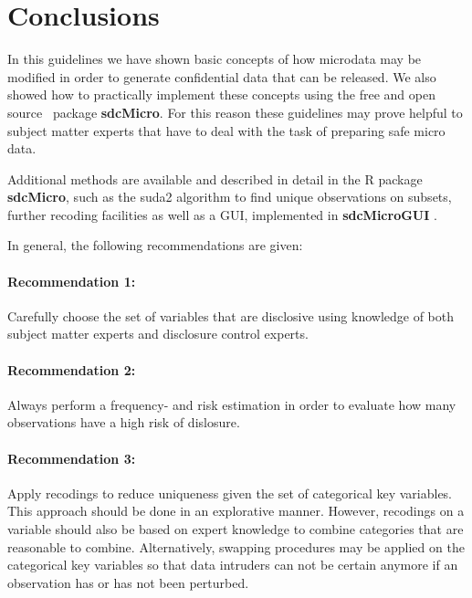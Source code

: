 \documentclass[12pt]{article}
\newcommand{\pkg}[1]{\textbf{#1}}
\newcommand{\proglang}[1]{\textsf{#1}}
\begin{document}

\newpage
\section{Conclusions} \label{sec:conclusions}








In this guidelines we have shown basic concepts of how microdata may be modified in
order to generate confidential data that can be released.
 We also showed how to practically implement these concepts using the free and open source \R~package \pkg{sdcMicro}. 
 For this reason these guidelines may prove helpful to subject matter experts that have to deal with the task of preparing safe micro data.

Additional methods are available and described in detail in the \proglang{R} package \pkg{sdcMicro}, such as the suda2 algorithm to
find unique observations on subsets, further recoding facilities as well as a GUI, implemented in \pkg{sdcMicroGUI} \citep{Templ09tdp}.

In general, the following recommendations are given:
\paragraph{Recommendation 1:} Carefully choose the set of variables that are disclosive using knowledge of both subject 
matter experts and disclosure control experts. 

\paragraph{Recommendation 2:} Always perform a frequency- and risk estimation in order to evaluate how many observations have a high risk of dislosure.

\paragraph{Recommendation 3:} Apply recodings to reduce uniqueness given the set of categorical key variables.
This approach should be done in an explorative manner.
However, recodings on a variable should also be based on expert knowledge to combine categories that are reasonable to combine.
Alternatively, swapping procedures may
be applied on the categorical key variables so that data intruders can not be
certain anymore if an observation has or has not been perturbed.
\end{document}
